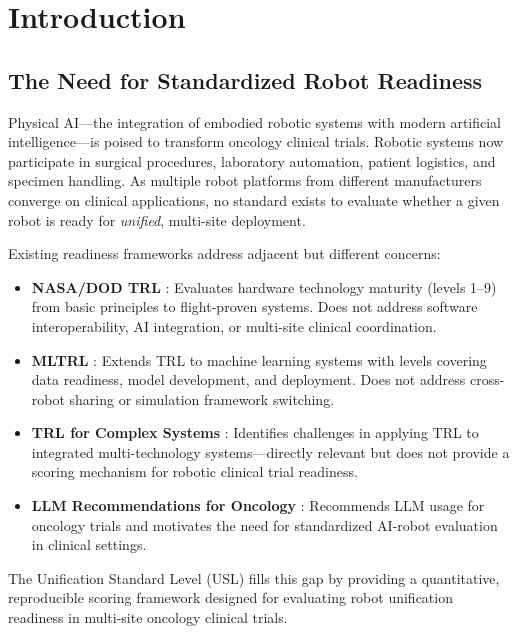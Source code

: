\documentclass[11pt,a4paper]{article}
\begin{document}
\section{Introduction}
\label{sec:introduction}

\subsection{The Need for Standardized Robot Readiness}
Physical AI---the integration of embodied robotic systems with modern artificial intelligence---is poised to transform oncology clinical trials. Robotic systems now participate in surgical procedures, laboratory automation, patient logistics, and specimen handling. As multiple robot platforms from different manufacturers converge on clinical applications, no standard exists to evaluate whether a given robot is ready for \emph{unified}, multi-site deployment.

Existing readiness frameworks address adjacent but different concerns:
\begin{itemize}
  \item \textbf{NASA/DOD TRL} \cite{mankins2004trl}: Evaluates hardware technology maturity (levels 1--9) from basic principles to flight-proven systems. Does not address software interoperability, AI integration, or multi-site clinical coordination.
  \item \textbf{MLTRL} \cite{lavin2021mltrl}: Extends TRL to machine learning systems with levels covering data readiness, model development, and deployment. Does not address cross-robot sharing or simulation framework switching.
  \item \textbf{TRL for Complex Systems} \cite{tomaschek2015trl}: Identifies challenges in applying TRL to integrated multi-technology systems---directly relevant but does not provide a scoring mechanism for robotic clinical trial readiness.
  \item \textbf{LLM Recommendations for Oncology} \cite{kawchak2025oncology}: Recommends LLM usage for oncology trials and motivates the need for standardized AI-robot evaluation in clinical settings.
\end{itemize}

The Unification Standard Level (USL) fills this gap by providing a quantitative, reproducible scoring framework designed for evaluating robot unification readiness in multi-site oncology clinical trials.
\end{document}
